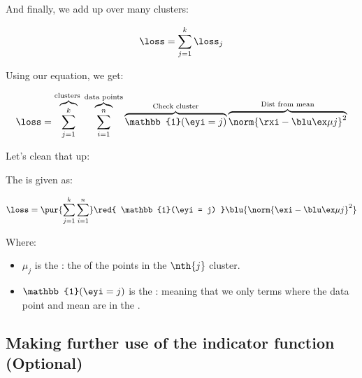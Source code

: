         And finally, we add up over many clusters:
        
        \begin{equation}
            \loss = \sum_{j=1}^k \loss_j
        \end{equation}
        
        Using our equation, we get:
        
        \begin{equation*}
                \loss =
                \overbrace{
                    \sum_{j=1}^k
                }^{\text{clusters }}
                \overbrace{
                \sum_{i=1}^n 
                }^{\text{data points}}
                    \overbrace{
                        \mathbb{1}(\eyi = j)
                    }^{ \text{Check cluster}}
                    \overbrace{
                        \norm{ \rxi - \bmuj }^2 
                    }^{\text{Dist from mean} }
            \end{equation*}
            
            Let's clean that up:\\
        
        \begin{kequation}
            The  is given as:
            
            \begin{equation*}
                \loss =
                \pur{
                    \sum_{j=1}^k \sum_{i=1}^n
                }
                \red{
                    \mathbb{1}(\eyi = j)
                }
                \blu{
                    \norm{ \exi - \bmuj }^2 
                }
            \end{equation*}
            
            Where:
            
            \begin{itemize}
                \item $\mu_j$ is the : the  of the points in the $\nth{j}$ cluster.
                
                \item $\mathbb{1}(\eyi = j)$ is the : meaning that we only  terms where the data point and mean are in the .
            \end{itemize}
        \end{kequation}
        
        
    \subsection{Making further use of the indicator function (Optional)}
        
